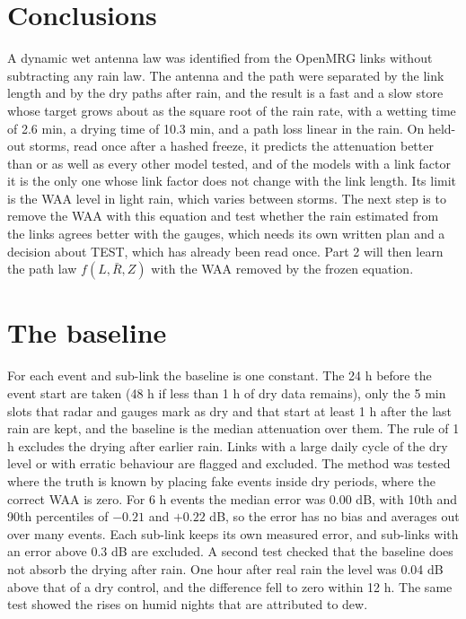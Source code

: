 \documentclass[reprint,aps,pra,amsmath,amssymb,nofootinbib,superscriptaddress]{revtex4-2}
\newcommand{\Rb}{\bar{R}}
\begin{document}
\section{Conclusions}
\label{sec:conclusions}

A dynamic wet antenna law was identified from the OpenMRG links without subtracting any rain law. The antenna and the
path were separated by the link length and by the dry paths after rain, and the result is a fast and a slow store whose
target grows about as the square root of the rain rate, with a wetting time of 2.6 min, a drying time of 10.3 min, and a
path loss linear in the rain. On held-out storms, read once after a hashed freeze, it predicts the attenuation better than
or as well as every other model tested, and of the models with a link factor it is the only one whose link factor does not change with the link length.
Its limit is the WAA level in light rain, which varies between storms. The next step is to remove the WAA with this
equation and test whether the rain estimated from the links agrees better with the gauges, which needs its own written
plan and a decision about TEST, which has already been read once. Part 2 will then learn the path law $f(L,\Rb,Z)$ with
the WAA removed by the frozen equation.

\appendix

\section{The baseline}
\label{app:baseline}
For each event and sub-link the baseline is one constant. The 24 h before the event start are taken (48 h if less than 1 h
of dry data remains), only the 5 min slots that radar and gauges mark as dry and that start at least 1 h after the last rain
are kept, and the baseline is the median attenuation over them. The rule of 1 h excludes the drying after earlier rain.
Links with a large daily cycle of the dry level or with erratic behaviour are flagged and excluded. The method was tested
where the truth is known by placing fake events inside dry periods, where the correct WAA is zero. For 6 h events the
median error was 0.00 dB, with 10th and 90th percentiles of $-0.21$ and $+0.22$ dB, so the error has no bias and averages
out over many events. Each sub-link keeps its own measured error, and sub-links with an error above 0.3 dB are excluded. A
second test checked that the baseline does not absorb the drying after rain. One hour after real rain the level was
0.04 dB above that of a dry control, and the difference fell to zero within 12 h. The same test showed the rises on humid
nights that are attributed to dew.
\end{document}
